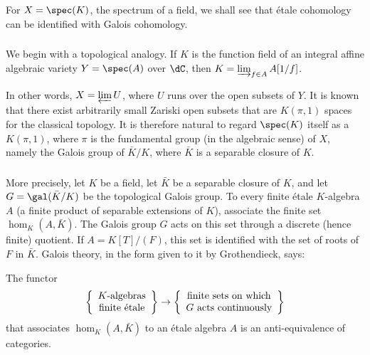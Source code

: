 \documentclass[oneside]{book}
\begin{document}
For $X=\spec(K)$, the spectrum of a field, we shall see that étale
cohomology can be identified with Galois cohomology.

\subsubsection{}\label{I:2-4-1}

We begin with a topological analogy. If $K$ is the function field of an
integral affine algebraic variety $Y=\spec(A)$ over $\dC$, then
$K=\varinjlim_{f\in A}A[1/f]$.

In other words, $X=\varprojlim U$, where $U$ runs over the open subsets
of $Y$. It is known that there exist arbitrarily small Zariski open
subsets that are $K(\pi,1)$ spaces for the classical topology. It is
therefore natural to regard $\spec(K)$ itself as a $K(\pi,1)$, where
$\pi$ is the fundamental group (in the algebraic sense) of $X$, namely
the Galois group of $\bar K/K$, where $\bar K$ is a separable closure of
$K$.

\subsubsection{}\label{I:2-4-2}

More precisely, let $K$ be a field, let $\bar K$ be a separable closure
of $K$, and let $G=\gal(\bar K/K)$ be the topological Galois group. To
every finite étale $K$-algebra $A$ (a finite product of separable
extensions of $K$), associate the finite set $\hom_K(A,\bar K)$. The
Galois group $G$ acts on this set through a discrete (hence finite)
quotient. If $A=K[T]/(F)$, this set is identified with the set of roots
of $F$ in $\bar K$. Galois theory, in the form given to it by
Grothendieck, says:

\begin{proposition}\label{I:2-4-3}
The functor
\[
  \left\{\begin{array}{c}
          \textnormal{$K$-algebras} \\
          \textnormal{finite étale}
        \end{array}\right\}
  \to
  \left\{\begin{array}{c}
          \textnormal{finite sets on which} \\
          \textnormal{$G$ acts continuously}
        \end{array}\right\}
\]
that associates $\hom_K(A,\bar K)$ to an étale algebra $A$ is an
anti-equivalence of categories.
\end{proposition}
\end{document}
